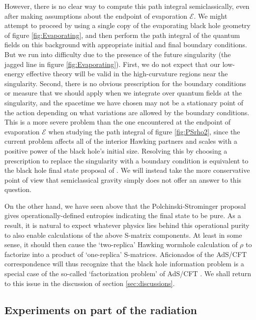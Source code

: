 \documentclass[letterpaper,12pt]{article}
\newcommand*{\evap}{\mathscr{E}} %
\begin{document}
However,  there is no clear way to compute this path integral semiclassically, even after making assumptions about the endpoint of evaporation $\evap$. We might attempt to proceed by using a single copy of the evaporating black hole geometry of figure \ref{fig:Evaporating}, and then perform the path integral of the quantum fields on this background with appropriate initial and final boundary conditions. But we run into difficulty due to the presence of the future singularity (the jagged line in figure \ref{fig:Evaporating}). First, we do not expect that our low-energy effective theory will be valid in the high-curvature regions near the singularity. Second, there is no obvious prescription for the boundary conditions or measure that we should apply when we integrate over quantum fields at the singularity, and the spacetime we have chosen may not be a stationary point of the action depending on what variations are allowed by the boundary conditions.  This is a more severe problem than the one encountered at the endpoint of evaporation $\evap$ when studying the path integral of figure \ref{fig:PSrho2}, since the current problem affects all of the interior Hawking partners and scales with a positive power of the black hole's  initial size. Resolving this by choosing a prescription to replace the singularity with a boundary condition is equivalent to the black hole final state proposal of \cite{Horowitz:2003he}. We will instead take the more conservative point of view that semiclassical gravity simply does not offer an answer to this question.

On the other hand, we have seen above that the Polchinski-Strominger proposal gives operationally-defined entropies indicating the final state to be pure.  As a result, it is natural to expect whatever physics lies behind this operational purity to also enable calculations of the above S-matrix components.  At least in some sense, it should then cause the `two-replica' Hawking wormhole calculation of $\rho$ to factorize into a product of `one-replica' S-matrices.  Aficionados of the AdS/CFT correspondence will thus recognize that the black hole information problem is a special case of the so-called `factorization problem' of AdS/CFT \cite{Rey:1998yx,Maldacena:2004rf,ArkaniHamed:2007js}.  We shall return to this issue in the discussion of section \ref{sec:discussions}.

\subsection{Experiments on part of the radiation}
\label{sec:PSu}
\end{document}
